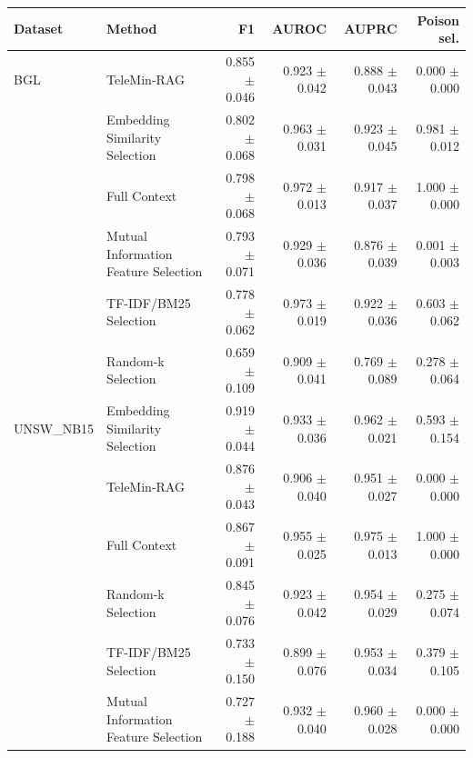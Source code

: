 \begin{tabular}{llrrrr}
\toprule
Dataset & Method & F1 & AUROC & AUPRC & Poison sel. \\
\midrule
BGL & TeleMin-RAG & 0.855 $\pm$ 0.046 & 0.923 $\pm$ 0.042 & 0.888 $\pm$ 0.043 & 0.000 $\pm$ 0.000 \\
 & Embedding Similarity Selection & 0.802 $\pm$ 0.068 & 0.963 $\pm$ 0.031 & 0.923 $\pm$ 0.045 & 0.981 $\pm$ 0.012 \\
 & Full Context & 0.798 $\pm$ 0.068 & 0.972 $\pm$ 0.013 & 0.917 $\pm$ 0.037 & 1.000 $\pm$ 0.000 \\
 & Mutual Information Feature Selection & 0.793 $\pm$ 0.071 & 0.929 $\pm$ 0.036 & 0.876 $\pm$ 0.039 & 0.001 $\pm$ 0.003 \\
 & TF-IDF/BM25 Selection & 0.778 $\pm$ 0.062 & 0.973 $\pm$ 0.019 & 0.922 $\pm$ 0.036 & 0.603 $\pm$ 0.062 \\
 & Random-k Selection & 0.659 $\pm$ 0.109 & 0.909 $\pm$ 0.041 & 0.769 $\pm$ 0.089 & 0.278 $\pm$ 0.064 \\
\midrule
UNSW_NB15 & Embedding Similarity Selection & 0.919 $\pm$ 0.044 & 0.933 $\pm$ 0.036 & 0.962 $\pm$ 0.021 & 0.593 $\pm$ 0.154 \\
 & TeleMin-RAG & 0.876 $\pm$ 0.043 & 0.906 $\pm$ 0.040 & 0.951 $\pm$ 0.027 & 0.000 $\pm$ 0.000 \\
 & Full Context & 0.867 $\pm$ 0.091 & 0.955 $\pm$ 0.025 & 0.975 $\pm$ 0.013 & 1.000 $\pm$ 0.000 \\
 & Random-k Selection & 0.845 $\pm$ 0.076 & 0.923 $\pm$ 0.042 & 0.954 $\pm$ 0.029 & 0.275 $\pm$ 0.074 \\
 & TF-IDF/BM25 Selection & 0.733 $\pm$ 0.150 & 0.899 $\pm$ 0.076 & 0.953 $\pm$ 0.034 & 0.379 $\pm$ 0.105 \\
 & Mutual Information Feature Selection & 0.727 $\pm$ 0.188 & 0.932 $\pm$ 0.040 & 0.960 $\pm$ 0.028 & 0.000 $\pm$ 0.000 \\
\bottomrule
\end{tabular}
